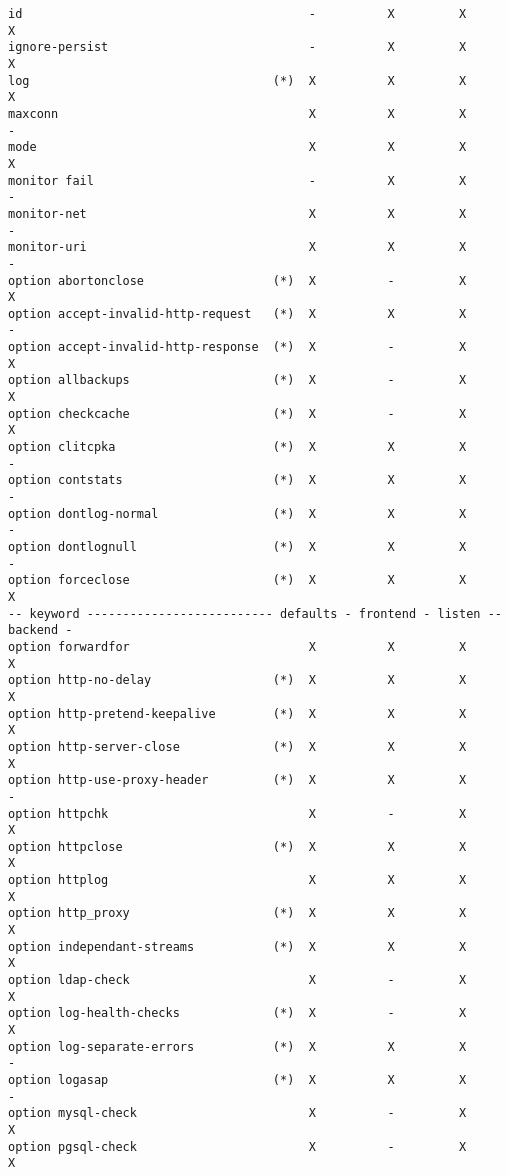 \begin{verbatim}
id                                        -          X         X         X
ignore-persist                            -          X         X         X
log                                  (*)  X          X         X         X
maxconn                                   X          X         X         -
mode                                      X          X         X         X
monitor fail                              -          X         X         -
monitor-net                               X          X         X         -
monitor-uri                               X          X         X         -
option abortonclose                  (*)  X          -         X         X
option accept-invalid-http-request   (*)  X          X         X         -
option accept-invalid-http-response  (*)  X          -         X         X
option allbackups                    (*)  X          -         X         X
option checkcache                    (*)  X          -         X         X
option clitcpka                      (*)  X          X         X         -
option contstats                     (*)  X          X         X         -
option dontlog-normal                (*)  X          X         X         -
option dontlognull                   (*)  X          X         X         -
option forceclose                    (*)  X          X         X         X
-- keyword -------------------------- defaults - frontend - listen -- backend -
option forwardfor                         X          X         X         X
option http-no-delay                 (*)  X          X         X         X
option http-pretend-keepalive        (*)  X          X         X         X
option http-server-close             (*)  X          X         X         X
option http-use-proxy-header         (*)  X          X         X         -
option httpchk                            X          -         X         X
option httpclose                     (*)  X          X         X         X
option httplog                            X          X         X         X
option http_proxy                    (*)  X          X         X         X
option independant-streams           (*)  X          X         X         X
option ldap-check                         X          -         X         X
option log-health-checks             (*)  X          -         X         X
option log-separate-errors           (*)  X          X         X         -
option logasap                       (*)  X          X         X         -
option mysql-check                        X          -         X         X
option pgsql-check                        X          -         X         X

\end{verbatim}
